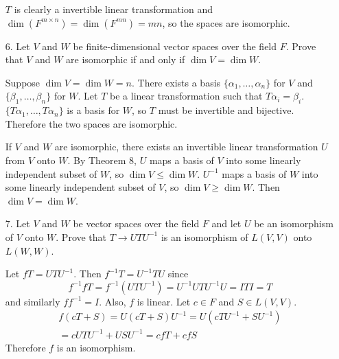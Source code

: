 \documentclass{article}
\begin{document}
\begin{enumerate}[listparindent=\parindent]
    \(T\) is clearly a invertible linear transformation and \\
    \(\dim(F^{m \times n}) = \dim(F^{mn}) = mn\), so the spaces are isomorphic.

\item[6.] Let \(V\) and \(W\) be finite-dimensional vector spaces over the field \(F\). Prove that \(V\) and \(W\) are isomorphic if and only if \(\dim V = \dim W\).

    Suppose \(\dim V = \dim W = n\). There exists a basis \(\{\alpha_1, \dots, \alpha_n\}\) for \(V\) and \(\{\beta_1, \dots, \beta_n\}\) for \(W\).
    Let \(T\) be a linear transformation such that \(T\alpha_i = \beta_i\). \(\{T\alpha_1, \dots, T\alpha_n\}\) is a basis for \(W\), so \(T\) must be invertible and bijective.
    Therefore the two spaces are isomorphic.

    If \(V\) and \(W\) are isomorphic, there exists an invertible linear transformation \(U\) from \(V\) onto \(W\).
    By Theorem 8, \(U\) maps a basis of \(V\) into some linearly independent subset of \(W\), so \(\dim V \leq \dim W\).
    \(U^{-1}\) maps a basis of \(W\) into some linearly independent subset of \(V\), so \(\dim V \geq \dim W\).
    Then \(\dim V = \dim W\).

\item[7.] Let \(V\) and \(W\) be vector spaces over the field \(F\) and let \(U\) be an isomorphism of \(V\) onto \(W\).
    Prove that \(T \rightarrow UTU^{-1}\) is an isomorphism of \(L(V, V)\) onto \(L(W, W)\).

    Let \(fT = UTU^{-1}\). Then \(f^{-1}T = U^{-1}TU\) since \[ f^{-1}fT = f^{-1}(UTU^{-1}) = U^{-1}UTU^{-1}U = ITI = T \] and similarly \(ff^{-1} = I\).
    Also, \(f\) is linear. Let \(c \in F\) and \(S \in L(V, V)\).
    \begin{gather*}
        f(cT + S) = U(cT + S)U^{-1} = U(cTU^{-1} + SU^{-1}) \\
        = cUTU^{-1} + USU^{-1} = cfT + cfS
    \end{gather*}
    Therefore \(f\) is an isomorphism.

\end{enumerate}
\end{document}
